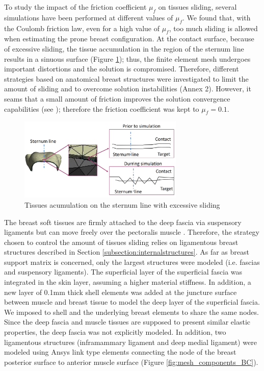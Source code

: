 To study the impact of the friction coefficient $\mu_f$ on tissues sliding, several simulations have been performed at different values of $\mu_f$. We found that, with the Coulomb friction law, even for a high value of $\mu_f$, too much sliding is allowed when estimating the prone breast configuration. At the contact surface, because of excessive sliding, the tissue accumulation in the region of the sternum line results in a sinuous surface (Figure \ref{fig:overslidingProblem}); thus, the finite element mesh  undergoes important distortions and the solution is compromised. Therefore, different strategies based on anatomical breast structures were investigated to limit the amount of sliding and to overcome solution instabilities (Annex 2). However, it seams that a small amount of friction improves the solution convergence capabilities (see \cite{ansys_contact_2017}); therefore the friction coefficient was kept to $\mu_f = 0.1$. 
\begin{figure}[!h]
\centering
\includegraphics[width=0.7\textwidth,keepaspectratio]{figures/overslidingProblem.jpg} 
\caption{Tissues acumulation on the sternum line with excessive sliding}\label{fig:overslidingProblem}
\end{figure}
 
The breast soft tissues are firmly attached to the deep fascia via suspensory ligaments but can move freely over the pectoralis muscle  \citep{mugea2014aesthetic,clemente2011anatomy}. Therefore, the strategy chosen to control the amount of tissues sliding relies on ligamentous breast structures described in Section \ref{subsection:internalstructures}. As far as  breast support matrix is concerned, only the largest structures were modeled (i.e. fascias and suspensory ligaments).  The superficial layer of the superficial fascia was integrated in the skin layer, assuming a higher material stiffness. In addition, a new layer of 0.1mm thick shell elements was added at the juncture surface between muscle and breast tissue to model the deep layer of the superficial fascia. We imposed to shell and the underlying breast elements to share the same nodes. Since the deep fascia and muscle tissues are supposed to present similar elastic properties, the deep fascia was not explicitly modeled. In addition, two ligamentous structures (inframammary ligament and deep medial ligament) were modeled using Ansys link type elements connecting the node of the breast posterior surface to anterior muscle surface (Figure \ref{fig:mesh_components_BC}).  


